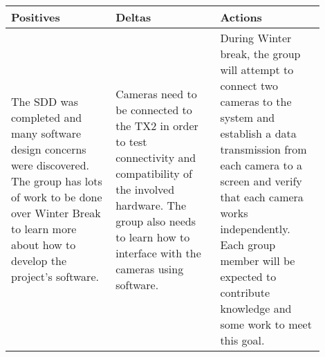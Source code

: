 \documentclass[letterpaper,10pt,serif,draftclsnofoot,onecolumn,compsoc,titlepage]{IEEEtran}
\begin{document}
\begin{tabular}{|p{0.3\linewidth}|p{0.3\linewidth}|p{0.3\linewidth}|}
   \hline
   \textbf{Positives} & \textbf{Deltas} & \textbf{Actions}\\ 
   \hline
   The SDD was completed and many software design concerns were discovered. The group 
   has lots of work to be done over Winter Break to learn more about how to develop 
   the project's software.  
   & 
   Cameras need to be connected to the TX2 in order to test connectivity and compatibility of the involved hardware. The group also needs to learn how to interface with the cameras using software.
   & 
   During Winter break, the group will attempt to connect two cameras to the system and establish a data transmission from each camera to a screen and verify that each camera works independently. Each group member will be expected to contribute knowledge and some work to meet this goal.
   \\
   \hline
\end{tabular}


\nocite{*}
\end{document}
